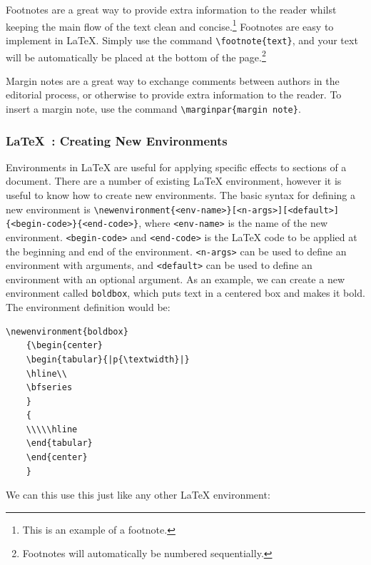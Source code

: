\documentclass[a4paper, 11pt]{report}
\begin{document}
Footnotes are a great way to provide extra information to the reader whilst keeping the main flow of the text clean and concise.\footnote{This is an example of a footnote.} Footnotes are easy to implement in LaTeX. Simply use the command \verb|\footnote{text}|, and your text will be automatically be placed at the bottom of the page.\footnote{Footnotes will automatically be numbered sequentially.}

Margin notes are a great way to exchange comments between authors in the editorial process, or otherwise to provide extra information to the reader. To insert a margin note, use the command \verb|\marginpar{margin note}|. 

\subsubsection{\LaTeX\ : Creating New Environments}

Environments in LaTeX are useful for applying specific effects to sections of a document. There are a number of existing LaTeX environment, however it is useful to know how to create new environments. The basic syntax for defining a new environment is \verb|\newenvironment{<env-name>}[<n-args>][<default>]{<begin-code>}{<end-code>}|, where \verb|<env-name>| is the name of the new environment. \verb|<begin-code>| and \verb|<end-code>| is the LaTeX code to be applied at the beginning and end of the environment. \verb|<n-args>| can be used to define an environment with arguments, and \verb|<default>| can be used to define an environment with an optional argument. As an example, we can create a new environment called \verb|boldbox|, which puts text in a centered box and makes it bold. The environment definition would be:

\begin{verbatim}
\newenvironment{boldbox}
    {\begin{center}
    \begin{tabular}{|p{\textwidth}|}
    \hline\\
    \bfseries
    }
    { 
    \\\\\hline
    \end{tabular} 
    \end{center}
    }
\end{verbatim}

We can this use this just like any other LaTeX environment:
\end{document}
